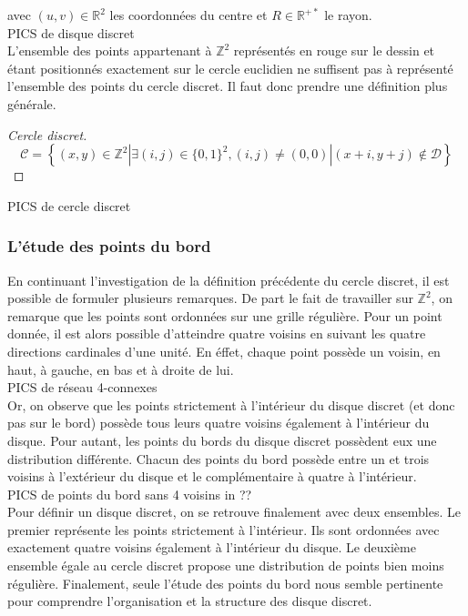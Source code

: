 avec $(u,v) \in \mathbb{R}^{2}$ les coordonnées du centre et $R \in \mathbb{R}^{+*}$ le rayon.\\

PICS de disque discret\\

L'ensemble des points appartenant à $\mathbb{Z}^{2}$ représentés en rouge sur le dessin et étant positionnés exactement sur le cercle euclidien ne suffisent pas à représenté l'ensemble des points du cercle discret. Il faut donc prendre une définition plus générale.

\begin{proof}[Cercle discret]
  $$ \mathcal{C} =  \left\{ (x,y) \in \mathbb{Z}^{2} | \exists (i,j) \in \{0,1\}^2, (i,j) \ne (0,0) | (x+i,y+j) \notin \mathcal{D} \right\}$$
\end{proof}

PICS de cercle discret\\

\subsubsection{L'étude des points du bord}

En continuant l'investigation de la définition précédente du cercle discret, il est possible de formuler plusieurs remarques. De part le fait de travailler sur $\mathbb{Z}^{2}$, on remarque que les points sont ordonnées sur une grille régulière. Pour un point donnée, il est alors possible d'atteindre quatre voisins en suivant les quatre directions cardinales d'une unité. En éffet, chaque point possède un voisin, en haut, à gauche, en bas et à droite de lui. \\

PICS de réseau 4-connexes\\

Or, on observe que les points strictement à l'intérieur du disque discret (et donc pas sur le bord) possède tous leurs quatre voisins également à l'intérieur du disque. Pour autant, les points du bords du disque discret possèdent eux une distribution différente. Chacun des points du bord possède entre un et trois voisins à l'extérieur du disque et le complémentaire à quatre à l'intérieur.\\

PICS de points du bord sans 4 voisins in ??\\

Pour définir un disque discret, on se retrouve finalement avec deux ensembles. Le premier représente les points strictement à l'intérieur. Ils sont ordonnées avec exactement quatre voisins également à l'intérieur du disque. Le deuxième ensemble égale au cercle discret propose une distribution de points bien moins régulière. Finalement, seule l'étude des points du bord nous semble pertinente pour comprendre l'organisation et la structure des disque discret.


